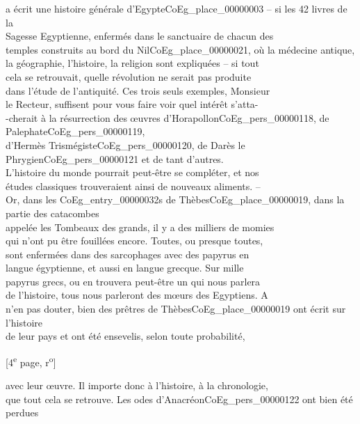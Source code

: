 \documentclass{book}
\begin{document}
a écrit une histoire générale d’Egypte\gls{CoEg_place_00000003} – si les 42 livres de la\\
Sagesse Egyptienne, enfermés dans le sanctuaire de chacun des\\
temples construits au bord du Nil\gls{CoEg_place_00000021}, où la médecine antique,\\
la géographie, l’histoire, la religion sont expliquées – si tout\\
cela se retrouvait, quelle révolution ne serait pas produite\\
dans l’étude de l’antiquité. Ces trois seuls exemples, Monsieur\\
le Recteur, suffisent pour vous faire voir quel intérêt s’atta-\\
-cherait à la résurrection des œuvres d’Horapollon\gls{CoEg_pers_00000118}, de Palephate\gls{CoEg_pers_00000119},\\
d’Hermès Trismégiste\gls{CoEg_pers_00000120}, de Darès le Phrygien\gls{CoEg_pers_00000121} et de tant d’autres.\\
L’histoire du monde pourrait peut-être se compléter, et nos\\
études classiques trouveraient ainsi de nouveaux aliments. –\\
Or, dans les \glspl{CoEg_entry_00000032} de Thèbes\gls{CoEg_place_00000019}, dans la partie des catacombes\\
appelée les Tombeaux des grands, il y a des milliers de momies\\
qui n’ont pu être fouillées encore. Toutes, ou presque toutes,\\
sont enfermées dans des sarcophages avec des papyrus en\\
langue égyptienne, et aussi en langue grecque. Sur mille\\
papyrus grecs, ou en trouvera peut-être un qui nous parlera\\
de l’histoire, tous nous parleront des mœurs des Egyptiens. A\\
n’en pas douter, bien des prêtres de Thèbes\gls{CoEg_place_00000019} ont écrit sur l’histoire\\
de leur pays et ont été ensevelis, selon toute probabilité,
{\footnotesize \begin{center} {[4\textsuperscript{e} page, r\textsuperscript{o}]}\end{center}}
\noindent avec leur œuvre. Il importe donc à l’histoire, à la chronologie,\\
que tout cela se retrouve. Les odes d’Anacréon\gls{CoEg_pers_00000122} ont bien été perdues\\
\end{document}

